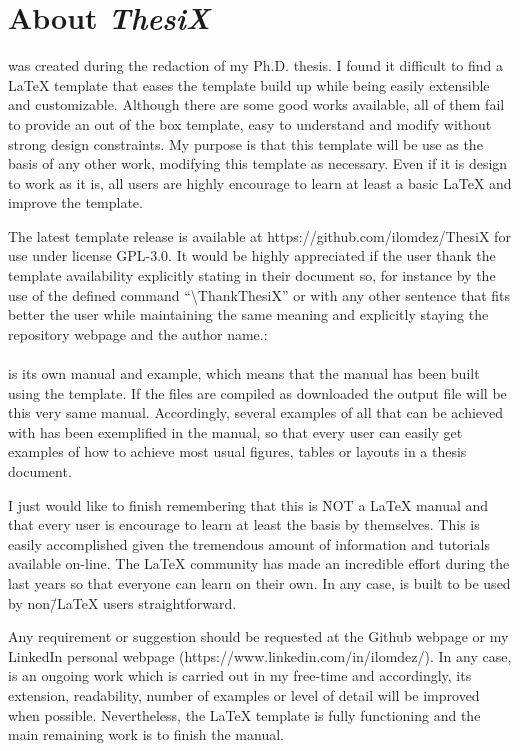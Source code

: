\section{About \textit{ThesiX}}
\ThesiX{} was created during the redaction of my Ph.D. thesis. I found it difficult to find a \LaTeX{} template that eases the template build up while being easily extensible and customizable. Although there are some good works available, all of them fail to provide an out of the box template, easy to understand and modify without strong design constraints. My purpose is that this template will be use as the basis of any other work, modifying this template as necessary. Even if it is design to work as it is, all users are highly encourage to learn at least a basic \LaTeX{} and improve the template.

The latest template release is available at https://github.com/ilomdez/ThesiX for use under license GPL-3.0. It would be highly appreciated if the user thank the template availability explicitly stating in their document so, for instance by the use of the defined command ``\textbackslash{}ThankThesiX'' or with any other sentence that fits better the user while maintaining the same meaning and explicitly staying the repository webpage and the \ThesiX{} author name.:\\

	\ThankThesiX{}\\

\ThesiX{} is its own manual and example, which means that the manual has been built using the \ThesiX{} template. If the files are compiled as downloaded the output file will be this very same manual. Accordingly, several examples of all that can be achieved with \ThesiX{} has been exemplified in the manual, so that every user can easily get examples of how to achieve most usual figures, tables or layouts in a thesis document.

I just would like to finish remembering that this is NOT a \LaTeX{} manual and that every user is encourage to learn at least the basis by themselves. This is easily accomplished given the tremendous amount of information and tutorials available on-line. The \LaTeX{} community has made an incredible effort during the last years so that everyone can learn on their own. In any case, \ThesiX{} is built to be used by non\=/\LaTeX{} users straightforward.

Any requirement or suggestion should be requested at the Github webpage or my LinkedIn personal webpage (https://www.linkedin.com/in/ilomdez/). In any case, \ThesiX{} is an ongoing work which is carried out in my free-time and accordingly, its extension, readability, number of examples or level of detail will be improved when possible. Nevertheless, the \LaTeX{} template is fully functioning and the main remaining work is to finish the manual.